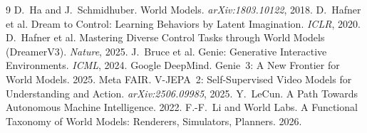 \documentclass[11pt]{article}
\begin{document}
\small
\begin{thebibliography}{9}
 D.~Ha and J.~Schmidhuber. World Models. \emph{arXiv:1803.10122}, 2018.
 D.~Hafner et al. Dream to Control: Learning Behaviors by Latent Imagination. \emph{ICLR}, 2020.
 D.~Hafner et al. Mastering Diverse Control Tasks through World Models (DreamerV3). \emph{Nature}, 2025.
 J.~Bruce et al. Genie: Generative Interactive Environments. \emph{ICML}, 2024.
 Google DeepMind. Genie~3: A New Frontier for World Models. 2025.
 Meta FAIR. V-JEPA~2: Self-Supervised Video Models for Understanding and Action. \emph{arXiv:2506.09985}, 2025.
 Y.~LeCun. A Path Towards Autonomous Machine Intelligence. 2022.
 F.-F.~Li and World Labs. A Functional Taxonomy of World Models: Renderers, Simulators, Planners. 2026.
\end{thebibliography}
\end{document}
